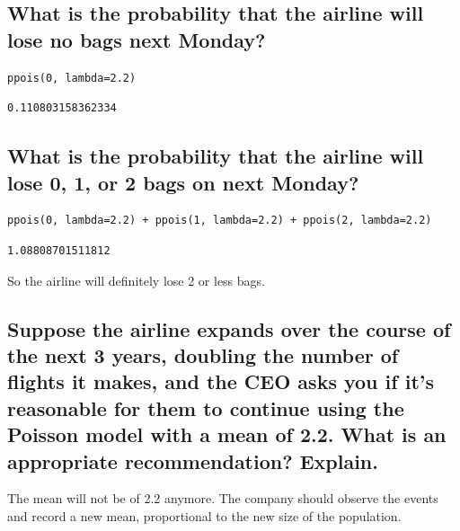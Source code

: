 \documentclass[11pt]{article}
\begin{document}
\subsection{What is the probability that the airline will lose no bags next Monday?}
\label{sec:orga8dc480}
\begin{verbatim}
ppois(0, lambda=2.2)
\end{verbatim}

\begin{verbatim}
0.110803158362334
\end{verbatim}

\subsection{What is the probability that the airline will lose 0, 1, or 2 bags on next Monday?}
\label{sec:org3ed032f}
\begin{verbatim}
ppois(0, lambda=2.2) + ppois(1, lambda=2.2) + ppois(2, lambda=2.2)
\end{verbatim}

\begin{verbatim}
1.08808701511812
\end{verbatim}


So the airline will definitely lose 2 or less bags.

\subsection{Suppose the airline expands over the course of the next 3 years, doubling the number of flights it makes, and the CEO asks you if it's reasonable for them to continue using the Poisson model with a mean of 2.2. What is an appropriate recommendation? Explain.}
\label{sec:orga183d80}
The mean will not be of 2.2 anymore. The company should observe the events and record a new mean, proportional to the new size of the population.
\end{document}
